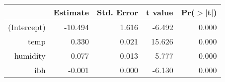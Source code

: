\begin{table}[ht]
\centering
\begin{tabular}{rrrrr}
  \hline
 & Estimate & Std. Error & t value & Pr($>$$|$t$|$) \\ 
  \hline
(Intercept) & -10.494 & 1.616 & -6.492 & 0.000 \\ 
  temp & 0.330 & 0.021 & 15.626 & 0.000 \\ 
  humidity & 0.077 & 0.013 & 5.777 & 0.000 \\ 
  ibh & -0.001 & 0.000 & -6.130 & 0.000 \\ 
   \hline
\end{tabular}
\end{table}
